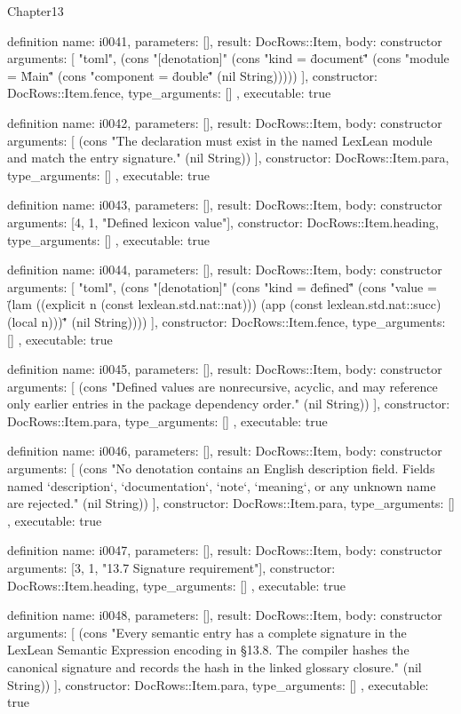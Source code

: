 \begin{lexlean}{Chapter13}
\begin{semanticmodule}
definition{
  name: i0041,
  parameters: [],
  result: DocRows::Item,
  body: constructor{
    arguments: [
      "toml",
      (cons "[denotation]" (cons "kind = \"document\"" (cons "module = \"Main\"" (cons "component = \"double\"" (nil String)))))
    ],
    constructor: DocRows::Item.fence,
    type_arguments: []
  },
  executable: true
}

definition{
  name: i0042,
  parameters: [],
  result: DocRows::Item,
  body: constructor{
    arguments: [
      (cons "The declaration must exist in the named LexLean module and match the entry signature." (nil String))
    ],
    constructor: DocRows::Item.para,
    type_arguments: []
  },
  executable: true
}

definition{
  name: i0043,
  parameters: [],
  result: DocRows::Item,
  body: constructor{
    arguments: [4, 1, "Defined lexicon value"],
    constructor: DocRows::Item.heading,
    type_arguments: []
  },
  executable: true
}

definition{
  name: i0044,
  parameters: [],
  result: DocRows::Item,
  body: constructor{
    arguments: [
      "toml",
      (cons "[denotation]" (cons "kind = \"defined\"" (cons "value = \"(lam ((explicit n (const lexlean.std.nat::nat))) (app (const lexlean.std.nat::succ) (local n)))\"" (nil String))))
    ],
    constructor: DocRows::Item.fence,
    type_arguments: []
  },
  executable: true
}

definition{
  name: i0045,
  parameters: [],
  result: DocRows::Item,
  body: constructor{
    arguments: [
      (cons "Defined values are nonrecursive, acyclic, and may reference only earlier entries in the package dependency order." (nil String))
    ],
    constructor: DocRows::Item.para,
    type_arguments: []
  },
  executable: true
}

definition{
  name: i0046,
  parameters: [],
  result: DocRows::Item,
  body: constructor{
    arguments: [
      (cons "No denotation contains an English description field. Fields named `description`, `documentation`, `note`, `meaning`, or any unknown name are rejected." (nil String))
    ],
    constructor: DocRows::Item.para,
    type_arguments: []
  },
  executable: true
}

definition{
  name: i0047,
  parameters: [],
  result: DocRows::Item,
  body: constructor{
    arguments: [3, 1, "13.7 Signature requirement"],
    constructor: DocRows::Item.heading,
    type_arguments: []
  },
  executable: true
}

definition{
  name: i0048,
  parameters: [],
  result: DocRows::Item,
  body: constructor{
    arguments: [
      (cons "Every semantic entry has a complete signature in the LexLean Semantic Expression encoding in §13.8. The compiler hashes the canonical signature and records the hash in the linked glossary closure." (nil String))
    ],
    constructor: DocRows::Item.para,
    type_arguments: []
  },
  executable: true
}


\end{semanticmodule}
\end{lexlean}
